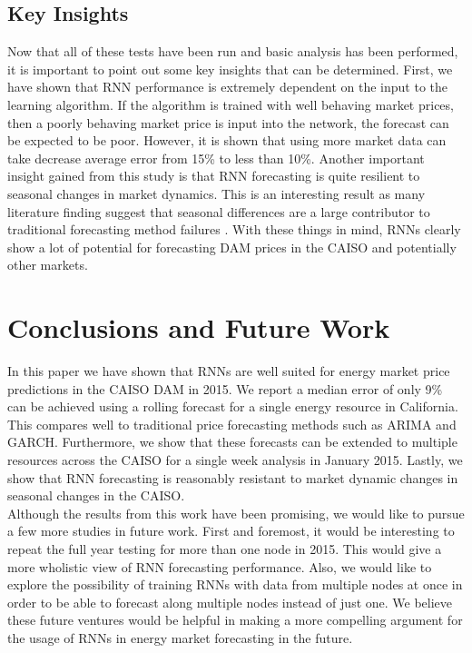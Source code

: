 \documentclass[sigconf]{acmart}
\begin{document}
\subsection{Key Insights}

Now that all of these tests have been run and basic analysis has been performed, it is important to point out some key insights that can be determined. First, we have shown that RNN performance is extremely dependent on the input to the learning algorithm. If the algorithm is trained with well behaving market prices, then a poorly behaving market price is input into the network, the forecast can be expected to be poor. However, it is shown that using more market data can take decrease average error from 15\% to less than 10\%. Another important insight gained from this study is that RNN forecasting is quite resilient to seasonal changes in market dynamics. This is an interesting result as many literature finding suggest that seasonal differences are a large contributor to traditional forecasting method failures \cite{Conejo2005a,Garcia2005}. With these things in mind, RNNs clearly show a lot of potential for forecasting DAM prices in the CAISO and potentially other markets. 

\section{Conclusions and Future Work}
\label{sec:conclusions}

In this paper we have shown that RNNs are well suited for energy market price predictions in the CAISO DAM in 2015. We report a median error of only 9\% can be achieved using a rolling forecast for a single energy resource in California. This compares well to traditional price forecasting methods such as ARIMA and GARCH. Furthermore, we show that these forecasts can be extended to multiple resources across the CAISO for a single week analysis in January 2015. Lastly, we show that RNN forecasting is reasonably resistant to market dynamic changes in seasonal changes in the CAISO.\\

Although the results from this work have been promising, we would like to pursue a few more studies in future work. First and foremost, it would be interesting to repeat the full year testing for more than one node in 2015. This would give a more wholistic view of RNN forecasting performance. Also, we would like to explore the possibility of training RNNs with data from multiple nodes at once in order to be able to forecast along multiple nodes instead of just one. We believe these future ventures would be helpful in making a more compelling argument for the usage of RNNs in energy market forecasting in the future.
\end{document}
